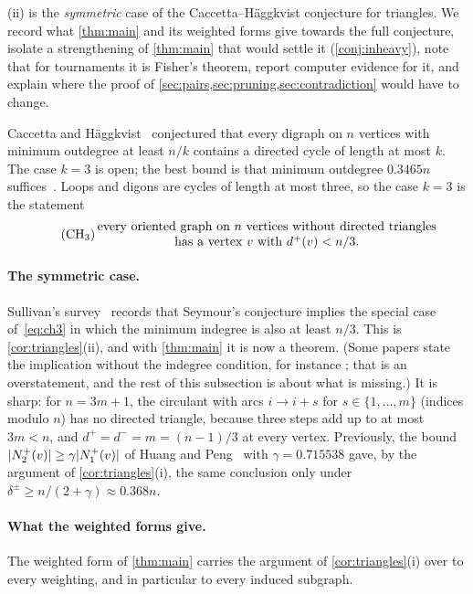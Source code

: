 \begin{idea}
(ii) is the \emph{symmetric} case of the Caccetta--H\"aggkvist
conjecture for triangles. We record what \cref{thm:main} and its weighted forms give
towards the full conjecture, isolate a strengthening of \cref{thm:main} that would
settle it (\cref{conj:inheavy}), note that for tournaments it is Fisher's theorem,
report computer evidence for it, and explain where the proof of
\cref{sec:pairs,sec:pruning,sec:contradiction} would have to change.
\end{idea}

Caccetta and H\"aggkvist~\cite{CaccettaHaggkvist1978} conjectured that every digraph on
$n$ vertices with minimum outdegree at least $n/k$ contains a directed cycle of length at
most $k$. The case $k=3$ is open; the best bound is that minimum outdegree $0.3465n$
suffices~\cite{HladkyKralNorin2017}. Loops and digons are cycles of length at most
three, so the case $k=3$ is the statement
\begingroup
\renewcommand{\theHequation}{CH3}
\begin{equation}\label{eq:ch3}\tag{CH$_3$}
 \parbox{0.78\textwidth}{\centering every oriented graph on $n$ vertices without
 directed triangles has a vertex $v$ with $d^+(v)<n/3$.}
\end{equation}
\endgroup

\paragraph{The symmetric case.}
Sullivan's survey~\cite[Section~3]{Sullivan2006} records that Seymour's conjecture
implies the special case of~\eqref{eq:ch3} in which the minimum indegree is also at
least $n/3$. This is \cref{cor:triangles}(ii), and with \cref{thm:main} it is now a
theorem. (Some papers state the implication without the indegree condition, for
instance \cite[Section~1]{BrantnerBrockmanKaySnively2009}; that is an overstatement,
and the rest of this subsection is about what is missing.) It is sharp: for $n=3m+1$, the circulant with arcs $i\to i+s$ for
$s\in\{1,\dots,m\}$ (indices modulo $n$) has no directed triangle, because three steps
add up to at most $3m<n$, and $d^+=d^-=m=(n-1)/3$ at every vertex. Previously, the
bound $\lvert N^+_2(v)\rvert\ge\gamma\lvert N^+_1(v)\rvert$ of Huang and Peng~\cite{HuangPeng2024}
with $\gamma=0.715538$ gave, by the argument of \cref{cor:triangles}(i), the same
conclusion only under $\delta^\pm\ge n/(2+\gamma)\approx0.368n$.

\paragraph{What the weighted forms give.}
The weighted form of \cref{thm:main} carries the argument of \cref{cor:triangles}(i)
over to every weighting, and in particular to every induced subgraph.

